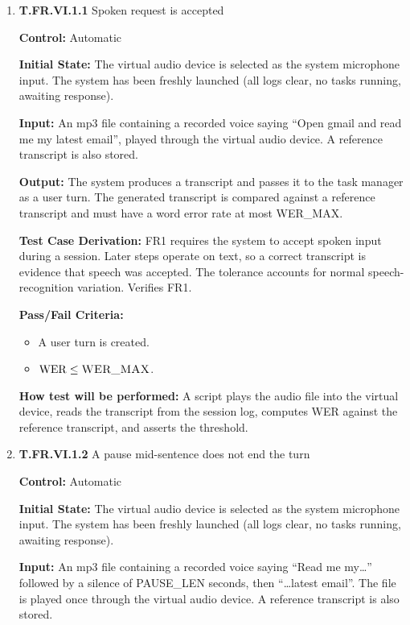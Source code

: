 \documentclass[12pt, titlepage]{article}
\begin{document}
\begin{enumerate}

\item{\textbf{T.FR.VI.1.1} Spoken request is accepted\\}\label{test:T.FR.VI.1.1}

\textbf{Control:} Automatic

\textbf{Initial State:} The virtual audio device is selected as the system
microphone input. The system has been freshly launched (all logs clear, no tasks running, awaiting response).

\textbf{Input:} An mp3 file containing a recorded voice saying
``Open gmail and read me my latest email'', played through the virtual audio device. A reference transcript is also stored.

\textbf{Output:} The system produces a transcript and passes it to the task
manager as a user turn. The generated transcript is compared against a reference transcript and must have 
a word error rate at most \textsc{WER\_MAX}.

\textbf{Test Case Derivation:} FR1 requires the system to accept spoken input
during a session. Later steps operate on text, so a correct transcript is evidence 
that speech was accepted. The tolerance accounts for normal speech-recognition variation. Verifies FR1.

\textbf{Pass/Fail Criteria:}
\begin{itemize}
  \item A user turn is created.
  \item $\mathrm{WER} \le \textsc{WER\_MAX}$.
\end{itemize}

\textbf{How test will be performed:} A script plays the audio file into the
virtual device, reads the transcript from the session log, computes WER
against the reference transcript, and asserts the threshold.


\item{\textbf{T.FR.VI.1.2} A pause mid-sentence does not end the turn\\}\label{test:T.FR.VI.1.2}

\textbf{Control:} Automatic

\textbf{Initial State:} The virtual audio device is selected as the system
microphone input. The system has been freshly launched (all logs clear, no tasks running, awaiting response).

\textbf{Input:} An mp3 file containing a recorded voice saying ``Read me my\ldots''
followed by a silence of \textsc{PAUSE\_LEN} seconds, then ``\ldots latest
email''. The file is played once through the virtual audio device. A reference transcript is also stored.


\end{enumerate}
\end{document}
